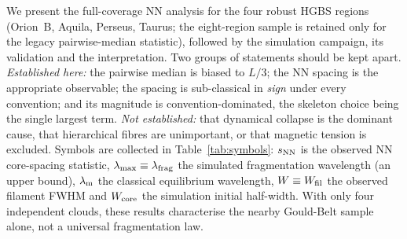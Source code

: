 \documentclass[usenatbib,twoside,twocolumn]{mnras}
\begin{document}
We present the full-coverage NN analysis for the four robust HGBS regions (Orion~B, Aquila, Perseus, Taurus; the eight-region sample is retained only for the legacy pairwise-median statistic), followed by the simulation campaign, its validation and the interpretation. Two groups of statements should be kept apart. \emph{Established here:} the pairwise median is biased to $L/3$; the NN spacing is the appropriate observable; the spacing is sub-classical in \emph{sign} under every convention; and its magnitude is convention-dominated, the skeleton choice being the single largest term. \emph{Not established:} that dynamical collapse is the dominant cause, that hierarchical fibres are unimportant, or that magnetic tension is excluded. Symbols are collected in Table~\ref{tab:symbols}: $s_{\rm NN}$ is the observed NN core-spacing statistic, $\lambda_{\rm max}\equiv\lambda_{\rm frag}$ the simulated fragmentation wavelength (an upper bound), $\lambda_{\rm m}$ the classical equilibrium wavelength, $W\equiv W_{\rm fil}$ the observed filament FWHM and $W_{\rm core}$ the simulation initial half-width. With only four independent clouds, these results characterise the nearby Gould-Belt sample alone, not a universal fragmentation law.
\end{document}
